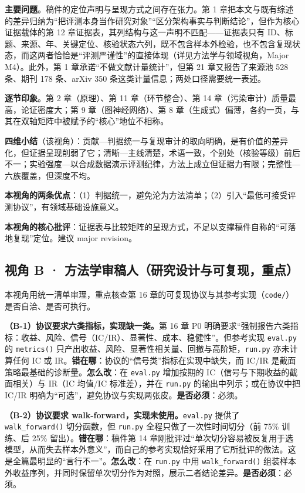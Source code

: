 \documentclass[11pt,a4paper]{ctexart}
\begin{document}
\textbf{主要问题}。稿件的定位声明与呈现方式之间存在张力。第 1 章把本文与既有综述的差异归纳为“把评测本身当作研究对象”“区分架构事实与判断结论”，但作为核心证据载体的第 12 章证据表，其列结构与这一声明不匹配——证据表只有 ID、标题、来源、年、关键定位、核验状态六列，既不包含样本外检验，也不包含复现状态，而这两者恰恰是“评测严谨性”的直接体现（详见方法学与领域视角，Major M4）。此外，第 1 章承诺“不做文献计量统计”，但第 21 章又报告了来源池 528 条、期刊 178 条、arXiv 350 条这类计量信息；两处口径需要统一表述。

\textbf{逐节印象}。第 2 章（原理）、第 11 章（环节整合）、第 14 章（污染审计）质量最高，论证密度大；第 9 章（图神经网络）、第 8 章（生成式）偏薄，各约一页，与其在双轴矩阵中被赋予的“核心”地位不相称。

\textbf{四维小结}（该视角）：贡献—判据统一与复现审计的取向明确，是有价值的差异化，但证据呈现削弱了它；清晰—主线清楚，术语一致，个别处（核验等级）前后不一；实验强度—以合成数据演示评测纪律，方法上成立但证据力有限；完整性—六族覆盖，但深度不均。

\textbf{本视角的两条优点}：（1）判据统一，避免沦为方法清单；（2）引入“最低可接受评测协议”，有领域基础设施意义。

\textbf{本视角的核心批评}：证据表与比较矩阵的呈现方式，不足以支撑稿件自称的“可落地复现”定位。建议 major revision。

\subsection{视角 B · 方法学审稿人（研究设计与可复现，重点）}

本视角用统一清单审理，重点核查第 16 章的可复现协议与其参考实现（\texttt{code/}）是否自洽、是否可执行。

\textbf{（B-1）协议要求六类指标，实现缺一类。}第 16 章 P0 明确要求“强制报告六类指标：收益、风险、信号（IC/IR）、显著性、成本、稳健性”。但参考实现 \texttt{eval.py} 的 \texttt{metrics()} 只产出收益、风险、显著性相关量、回撤与高阶矩，\texttt{run.py} 亦未计算任何 IC 或 IR。\textbf{错在哪}：协议的“信号类”指标在实现中缺失，而 IC/IR 是截面策略最基础的诊断量。\textbf{怎么改}：在 \texttt{eval.py} 增加按期的 IC（信号与下期收益的截面相关）与 IR（IC 均值/IC 标准差），并在 \texttt{run.py} 的输出中列示；或在协议中把 IC/IR 明确为“可选”，避免协议与实现两张皮。\textbf{是否必须}：必须。

\textbf{（B-2）协议要求 walk-forward，实现未使用。}\texttt{eval.py} 提供了 \texttt{walk\_forward()} 切分函数，但 \texttt{run.py} 全程只做了一次性时间切分（前 75\% 训练、后 25\% 留出）。\textbf{错在哪}：稿件第 14 章刚批评过“单次切分容易被反复用于选模型，从而失去样本外意义”，而自己的参考实现恰好采用了它所批评的做法。这是全篇最明显的“言行不一”。\textbf{怎么改}：在 \texttt{run.py} 中用 \texttt{walk\_forward()} 组装样本外收益序列，并同时保留单次切分作为对照，展示二者结论差异。\textbf{是否必须}：必须。
\end{document}
